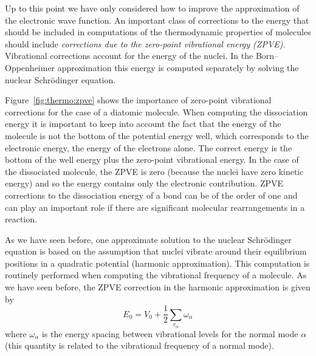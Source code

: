 \documentclass[../Main/chem371-notes.tex]{subfiles}
\begin{document}

Up to this point we have only considered how to improve the approximation of the electronic wave function.
An important class of corrections to the energy that should be included in computations of the thermodynamic properties of molecules should include \emph{corrections due to the zero-point vibrational energy (ZPVE)}.
Vibrational corrections account for the energy of the nuclei.
In the Born--Oppenheimer approximation this energy is computed separately by solving the nuclear Schr\"{o}dinger equation.

Figure~\ref{fig:thermo:zpve} shows the importance of zero-point vibrational corrections for the case of a diatomic molecule.
When computing the dissociation energy it is important to keep into account the fact that the energy of the molecule is not the bottom of the potential energy well, which corresponds to the electronic energy, the energy of the electrons alone.
The correct energy is the bottom of the well energy plus the zero-point vibrational energy.
In the case of the dissociated molecule, the ZPVE is zero (because the nuclei have zero kinetic energy) and so the energy contains only the electronic contribution.
ZPVE corrections to the dissociation energy of a bond can be of the order of one \kcal and can play an important role if there are significant molecular rearrangements in a reaction.

As we have seen before, one approximate solution to the nuclear Schr\"{o}dinger equation is based on the assumption that nuclei vibrate around their equilibrium positions in a quadratic potential (harmonic approximation).
This computation is routinely performed when computing the vibrational frequency of a molecule.
As we have seen before, the ZPVE correction in the harmonic approximation is given by
\begin{equation}
\label{eq:thermochemistry:zpve}
E_0 = V_0 + \frac{1}{2}  \sum_{v_\alpha} \omega_\alpha
\end{equation}
where $\omega_\alpha$ is the energy spacing between vibrational levels for the normal mode $\alpha$ (this quantity is related to the vibrational frequency of a normal mode).
\end{document}
